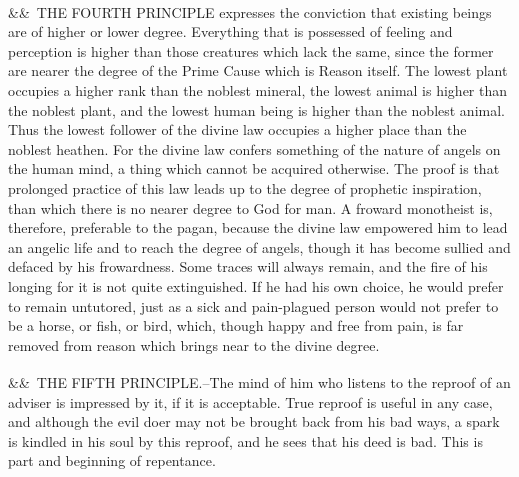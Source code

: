 \documentclass[12pt]{article}
\newcommand{\para}[1][]{\par\noindent\ifx&#1&\else\textsuperscript{\footnotesize #1}~\fi}
\begin{document}
\para THE FOURTH PRINCIPLE expresses the conviction that existing beings are of higher or lower degree. Everything that is possessed of feeling and perception is higher than those creatures which lack the same, since the former are nearer the degree of the Prime Cause which is Reason itself. The lowest plant occupies a higher rank than the noblest mineral, the lowest animal is higher than the noblest plant, and the lowest human being is higher than the noblest animal. Thus the lowest follower of the divine law occupies a higher place than the noblest heathen. For the divine law confers something of the nature of angels on the human mind, a thing which cannot be acquired otherwise. The proof is that prolonged practice of this law leads up to the degree of prophetic inspiration, than which there is no nearer degree to God for man. A froward monotheist is, therefore, preferable to the pagan, because the divine law empowered him to lead an angelic life and to reach the degree of angels, though it has become sullied and defaced by his frowardness. Some traces will always remain, and the fire of his longing for it is not quite extinguished. If he had his own choice, he would prefer to remain untutored, just as a sick and pain-plagued person would not prefer to be a horse, or fish, or bird, which, though happy and free from pain, is far removed from reason which brings near to the divine degree.

\para THE FIFTH PRINCIPLE.–The mind of him who listens to the reproof of an adviser is impressed by it, if it is acceptable. True reproof is useful in any case, and although the evil doer may not be brought back from his bad ways, a spark is kindled in his soul by this reproof, and he sees that his deed is bad. This is part and beginning of repentance.
\end{document}
